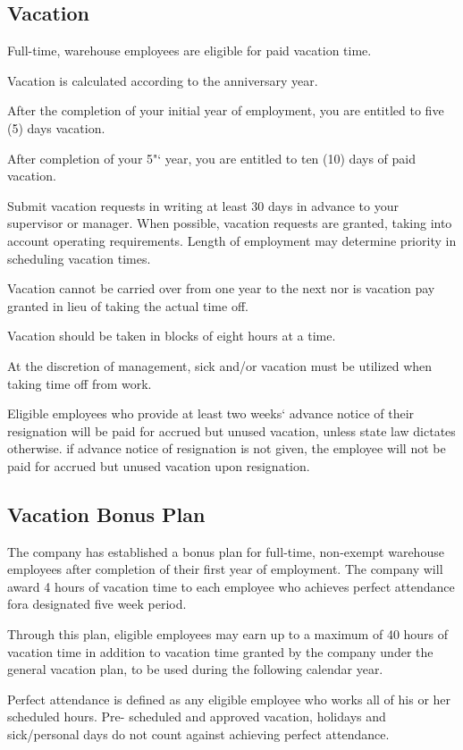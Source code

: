 \subsection{Vacation}

Full-time, warehouse employees are eligible for paid vacation time.

Vacation is calculated according to the anniversary year.

After the completion of your initial year of employment, you are entitled to five (5) days vacation.

After completion of your 5"‘ year, you are entitled to ten (10) days of paid vacation.

Submit vacation requests in writing at least 30 days in advance to your supervisor or manager. When possible, vacation requests are granted, taking into account operating requirements. Length of employment may determine priority in scheduling vacation times.

Vacation cannot be carried over from one year to the next nor is vacation pay granted in lieu of taking the actual time off.

Vacation should be taken in blocks of eight hours at a time.

At the discretion of management, sick and/or vacation must be utilized when taking time off from work.

Eligible employees who provide at least two weeks‘ advance notice of their resignation will be paid for accrued but unused vacation, unless state law dictates otherwise. if advance notice of resignation is not given, the employee will not be paid for accrued but unused vacation upon resignation.

\subsection{Vacation Bonus Plan}

The company has established a bonus plan for full-time, non-exempt warehouse employees after completion of their first year of employment. The company will award 4 hours of vacation time to each employee who achieves perfect attendance fora designated five week period.

Through this plan, eligible employees may earn up to a maximum of 40 hours of vacation time in addition to vacation time granted by the company under the general vacation plan, to be used during the following calendar year.

Perfect attendance is defined as any eligible employee who works all of his or her scheduled hours. Pre- scheduled and approved vacation, holidays and sick/personal days do not count against achieving perfect attendance.


